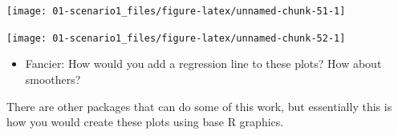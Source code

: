 \documentclass[
]{book}
\newenvironment{Shaded}{\begin{snugshade}}{\end{snugshade}}
\newcommand{\DataTypeTok}[1]{\textcolor[rgb]{0.13,0.29,0.53}{#1}}
\newcommand{\DecValTok}[1]{\textcolor[rgb]{0.00,0.00,0.81}{#1}}
\newcommand{\KeywordTok}[1]{\textcolor[rgb]{0.13,0.29,0.53}{\textbf{#1}}}
\newcommand{\NormalTok}[1]{#1}
\newcommand{\OperatorTok}[1]{\textcolor[rgb]{0.81,0.36,0.00}{\textbf{#1}}}
\newcommand{\StringTok}[1]{\textcolor[rgb]{0.31,0.60,0.02}{#1}}
\providecommand{\tightlist}{%
  \setlength{\itemsep}{0pt}\setlength{\parskip}{0pt}}
\begin{document}
\begin{center}\texttt{[image: 01-scenario1\_files/figure-latex/unnamed-chunk-51-1]} \end{center}

\begin{Shaded}
\end{Shaded}

\begin{center}\texttt{[image: 01-scenario1\_files/figure-latex/unnamed-chunk-52-1]} \end{center}

\begin{itemize}
\tightlist
\item
  Fancier: How would you add a regression line to these plots? How about smoothers?
\end{itemize}

There are other packages that can do some of this work, but essentially this is how you would create these plots using base R graphics.
\end{document}
